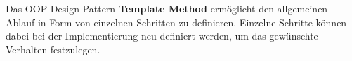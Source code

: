 Das OOP Design Pattern \textbf{Template Method} ermöglicht den allgemeinen Ablauf in Form von einzelnen Schritten zu definieren.
Einzelne Schritte können dabei bei der Implementierung neu definiert werden, um das gewünschte Verhalten festzulegen.
